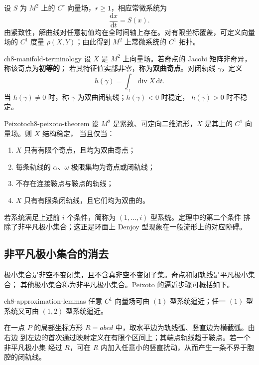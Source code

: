 设 $S$ 为 $M^2$ 上的 $C^r$ 向量场，$r\geq1$，相应常微系统为
\[
  \dfrac{\mathrm dx}{\mathrm dt}=S(x). \tag{2.1}
\]
由紧致性，解曲线对任意初值均在全时间轴上存在。对有限坐标覆盖，可定义向量场的
$C^1$ 度量 $\rho(X,Y)$；由此得到 $M^2$ 上常微系统的 $C^1$ 拓扑。

\begin{definition}{}{ch8-manifold-terminology}
设 $X$ 是 $M^2$ 上向量场。若奇点的 Jacobi 矩阵非奇异，称该奇点为\textbf{初等的}；
若其特征值实部非零，称为\textbf{双曲奇点}。对闭轨线 $\gamma$，定义
\[
 h(\gamma)=\int_\gamma\operatorname{div}X\,\mathrm dt.
\]
当 $h(\gamma)\ne0$ 时，称 $\gamma$ 为双曲闭轨线；$h(\gamma)<0$ 时稳定，
$h(\gamma)>0$ 时不稳定。
\end{definition}

\begin{theorem}{Peixoto}{ch8-peixoto-theorem}
设 $M^2$ 是紧致、可定向二维流形，$X$ 是其上的 $C^1$ 向量场。则 $X$ 结构稳定，
当且仅当：

\begin{enumerate}
  \item $X$ 只有有限个奇点，且均为双曲奇点；
  \item 每条轨线的 $\alpha$、$\omega$ 极限集均为奇点或闭轨线；
  \item 不存在连接鞍点与鞍点的轨线；
  \item $X$ 只有有限条闭轨线，且它们均为双曲的。
\end{enumerate}
\end{theorem}

若系统满足上述前 $i$ 个条件，简称为 $(1,\ldots,i)$ 型系统。定理中的第二个条件
排除了非平凡极小集合；这正是环面上 Denjoy 型现象在一般流形上的对应障碍。

\subsection*{非平凡极小集合的消去}

极小集合是非空不变闭集，且不含真非空不变闭子集。奇点和闭轨线是平凡极小集合；
其他极小集合称为非平凡极小集合。Peixoto 的逼近步骤可概括如下。

\begin{lemma}{}{ch8-approximation-lemmas}
任意 $C^1$ 向量场可由 $(1)$ 型系统逼近；任一 $(1)$ 型系统又可由 $(1,2)$ 型系统逼近。
\end{lemma}

在一点 $P$ 的局部坐标方形 $R=abcd$ 中，取水平边为轨线弧、竖直边为横截弧。由右边
到左边的首次通过映射定义在有限个区间上；其端点轨线趋于鞍点。若一个非平凡极小集
经过 $R$，可在 $R$ 内加入任意小的竖直扰动，从而产生一条不界于胞腔的闭轨线。

